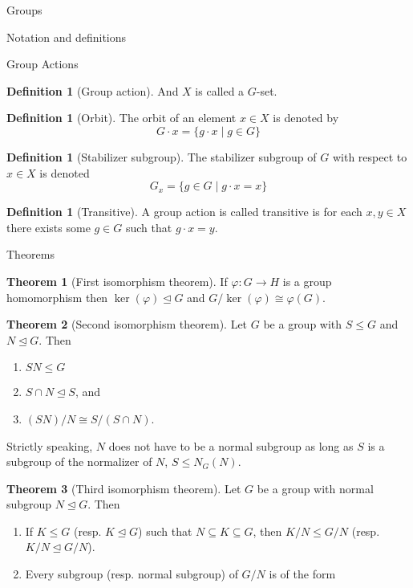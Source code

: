 \documentclass{article}
\theoremstyle{definition}
\newtheorem{theorem}{Theorem}
\numberwithin{theorem}{subsection} %
\theoremstyle{definition}
\newtheorem{definition}[paragraph]{Definition}
\newcommand{\set}[1]{\{#1\}}
\begin{document}
\begin{section}{Groups}
\begin{subsection}{Notation and definitions}
\begin{subsubsection}{Group Actions}
\begin{definition}[Group action]
        And $X$ is called a $G$-set.
      \end{definition}
      \begin{definition}[Orbit]
        The orbit of an element $x \in X$ is denoted by \[
          G \cdot x = \set{g \cdot x \mid g \in G}
        \]
      \end{definition}
      \begin{definition}[Stabilizer subgroup]
        The stabilizer subgroup of $G$ with respect to $x \in X$ is denoted \[
          G_x = \set{g \in G \mid g \cdot x = x}
        \]
      \end{definition}
      \begin{definition}[Transitive]
        A group action is called transitive is for each $x, y \in X$ there
        exists some $g \in G$ such that $g \cdot x = y$.
      \end{definition}
    \end{subsubsection}
  \end{subsection}
  \begin{subsection}{Theorems}
    \begin{theorem}[First isomorphism theorem]
      If $\varphi\colon G \rightarrow H$ is a group homomorphism then
      $\ker(\varphi) \trianglelefteq G$ and $G/\ker(\varphi) \cong \varphi(G)$.
    \end{theorem}
    \begin{theorem}[Second isomorphism theorem]
      Let $G$ be a group with $S \leq G$ and $N \trianglelefteq G$. Then
      \begin{enumerate}
        \item $SN \leq G$
        \item $S \cap N \trianglelefteq S$, and
        \item $(SN)/N \cong S/(S \cap N)$.
      \end{enumerate}
    \end{theorem}
    Strictly speaking, $N$ does not have to be a normal subgroup as long as $S$
    is a subgroup of the normalizer of $N$, $S \leq N_G(N)$.
    \begin{theorem}[Third isomorphism theorem]
      Let $G$ be a group with normal subgroup $N \trianglelefteq G$. Then
      \begin{enumerate}
        \item If $K \leq G$ (resp. $K \trianglelefteq G$) such that
        $N \subseteq K \subseteq G$, then $K/N \leq G/N$
        (resp. $K/N \trianglelefteq G/N$).
        \item Every subgroup (resp. normal subgroup) of $G/N$ is of the form

\end{enumerate}
\end{theorem}
\end{subsection}
\end{section}
\end{document}
